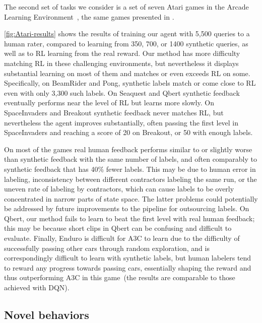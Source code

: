 \documentclass{article}
\begin{document}
The second set of tasks we consider is a set of
seven Atari games in the Arcade Learning Environment~\citep{Bellemare13},
the same games presented in \citealp{Mnih13}.


\autoref{fig:Atari-results} shows the results of training our agent with 5,500 queries to a human rater,
compared to learning from 350, 700, or 1400 synthetic queries,
as well as to RL learning from the real reward.
Our method has more difficulty matching RL in these challenging environments, but nevertheless it displays substantial learning on most of them and matches or even exceeds RL on some.  Specifically, on BeamRider and Pong, synthetic labels match or come close to RL even with only 3,300 such labels.  On Seaquest and Qbert synthetic feedback eventually performs near the level of RL but learns more slowly.  On SpaceInvaders and Breakout synthetic feedback never matches RL, but nevertheless the agent improves substantially, often passing the first level in SpaceInvaders and reaching a score of 20 on Breakout, or 50 with enough labels.

On most of the games real human feedback performs similar to or slightly worse than synthetic feedback with the same number of labels, and often comparably to synthetic feedback that has 40\% fewer labels.  This may be due to human error in labeling, inconsistency between different contractors labeling the same run, or the uneven rate of labeling by contractors, which can cause labels to be overly concentrated in narrow parts of state space.  The latter problems could potentially be addressed by future improvements to the pipeline for outsourcing labels.  On Qbert, our method fails to learn to beat the first level with real human feedback; this may be because short clips in Qbert can be confusing and difficult to evaluate.  Finally, Enduro is difficult for A3C to learn due to the difficulty of successfully passing other cars through random exploration, and is correspondingly difficult to learn with synthetic labels, but human labelers tend to reward any progress towards passing cars, essentially shaping the reward and thus outperforming A3C in this game~(the results are comparable to those achieved with DQN). 

\subsection{Novel behaviors}\label{sec:novel-behavior}
\end{document}
